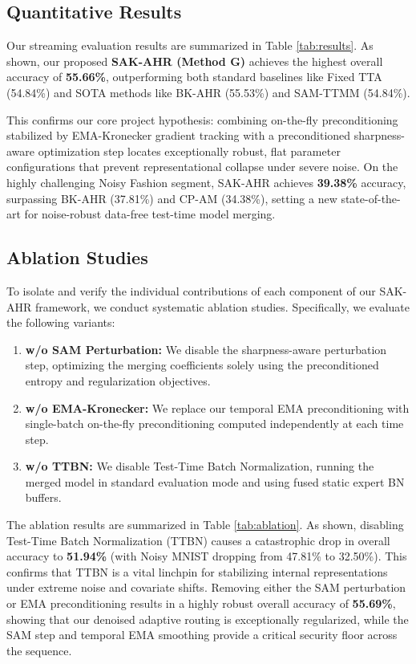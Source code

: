 \documentclass{article}
\theoremstyle{plain}
\theoremstyle{definition}
\theoremstyle{remark}
\begin{document}
\subsection{Quantitative Results}
Our streaming evaluation results are summarized in Table \ref{tab:results}. As shown, our proposed \textbf{SAK-AHR (Method G)} achieves the highest overall accuracy of \textbf{55.66\%}, outperforming both standard baselines like Fixed TTA (54.84\%) and SOTA methods like BK-AHR (55.53\%) and SAM-TTMM (54.84\%).

This confirms our core project hypothesis: combining on-the-fly preconditioning stabilized by EMA-Kronecker gradient tracking with a preconditioned sharpness-aware optimization step locates exceptionally robust, flat parameter configurations that prevent representational collapse under severe noise. On the highly challenging Noisy Fashion segment, SAK-AHR achieves \textbf{39.38\%} accuracy, surpassing BK-AHR (37.81\%) and CP-AM (34.38\%), setting a new state-of-the-art for noise-robust data-free test-time model merging.

\subsection{Ablation Studies}
To isolate and verify the individual contributions of each component of our SAK-AHR framework, we conduct systematic ablation studies. Specifically, we evaluate the following variants:
\begin{enumerate}
    \item \textbf{w/o SAM Perturbation:} We disable the sharpness-aware perturbation step, optimizing the merging coefficients solely using the preconditioned entropy and regularization objectives.
    \item \textbf{w/o EMA-Kronecker:} We replace our temporal EMA preconditioning with single-batch on-the-fly preconditioning computed independently at each time step.
    \item \textbf{w/o TTBN:} We disable Test-Time Batch Normalization, running the merged model in standard evaluation mode and using fused static expert BN buffers.
\end{enumerate}

The ablation results are summarized in Table \ref{tab:ablation}. As shown, disabling Test-Time Batch Normalization (TTBN) causes a catastrophic drop in overall accuracy to \textbf{51.94\%} (with Noisy MNIST dropping from 47.81\% to 32.50\%). This confirms that TTBN is a vital linchpin for stabilizing internal representations under extreme noise and covariate shifts. Removing either the SAM perturbation or EMA preconditioning results in a highly robust overall accuracy of \textbf{55.69\%}, showing that our denoised adaptive routing is exceptionally regularized, while the SAM step and temporal EMA smoothing provide a critical security floor across the sequence.
\end{document}
